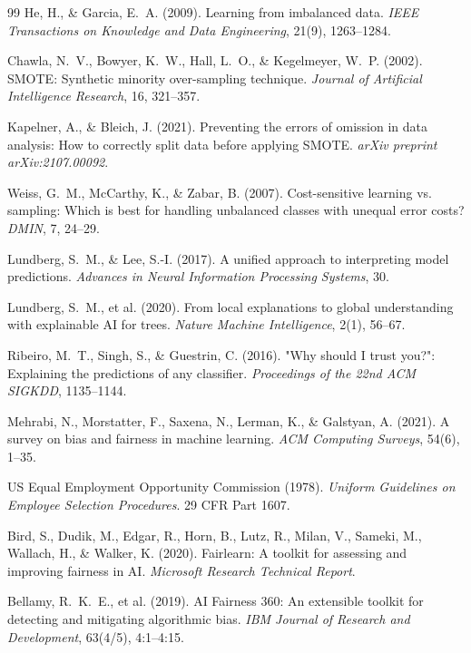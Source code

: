 \documentclass[12pt, a4paper]{article}
\begin{document}
\begin{thebibliography}{99}
He, H., \& Garcia, E.~A. (2009).
Learning from imbalanced data.
\textit{IEEE Transactions on Knowledge and Data Engineering}, 21(9), 1263--1284.

Chawla, N.~V., Bowyer, K.~W., Hall, L.~O., \& Kegelmeyer, W.~P. (2002).
SMOTE: Synthetic minority over-sampling technique.
\textit{Journal of Artificial Intelligence Research}, 16, 321--357.

Kapelner, A., \& Bleich, J. (2021).
Preventing the errors of omission in data analysis: How to correctly split data
before applying SMOTE.
\textit{arXiv preprint arXiv:2107.00092}.

Weiss, G.~M., McCarthy, K., \& Zabar, B. (2007).
Cost-sensitive learning vs. sampling: Which is best for handling unbalanced classes with unequal error costs?
\textit{DMIN}, 7, 24--29.

Lundberg, S.~M., \& Lee, S.-I. (2017).
A unified approach to interpreting model predictions.
\textit{Advances in Neural Information Processing Systems}, 30.

Lundberg, S.~M., et al. (2020).
From local explanations to global understanding with explainable AI for trees.
\textit{Nature Machine Intelligence}, 2(1), 56--67.

Ribeiro, M.~T., Singh, S., \& Guestrin, C. (2016).
"Why should I trust you?": Explaining the predictions of any classifier.
\textit{Proceedings of the 22nd ACM SIGKDD}, 1135--1144.

Mehrabi, N., Morstatter, F., Saxena, N., Lerman, K., \& Galstyan, A. (2021).
A survey on bias and fairness in machine learning.
\textit{ACM Computing Surveys}, 54(6), 1--35.

US Equal Employment Opportunity Commission (1978).
\textit{Uniform Guidelines on Employee Selection Procedures}.
29 CFR Part 1607.

Bird, S., Dudik, M., Edgar, R., Horn, B., Lutz, R., Milan, V., Sameki, M., Wallach, H., \& Walker, K. (2020).
Fairlearn: A toolkit for assessing and improving fairness in AI.
\textit{Microsoft Research Technical Report}.

Bellamy, R.~K.~E., et al. (2019).
AI Fairness 360: An extensible toolkit for detecting and mitigating algorithmic bias.
\textit{IBM Journal of Research and Development}, 63(4/5), 4:1--4:15.


\end{thebibliography}
\end{document}
